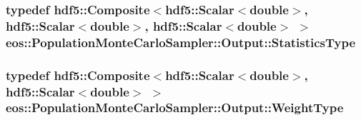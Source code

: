 \label{structeos_1_1PopulationMonteCarloSampler_1_1Output_ab096268a8fccb7e8d34ed08b93df880c}
\hypertarget{structeos_1_1PopulationMonteCarloSampler_1_1Output_abe071d58f8cee75754bcc593ec33e9b8}{
\subsubsection[{StatisticsType}]{\setlength{\rightskip}{0pt plus 5cm}typedef {\bf hdf5::Composite}$<${\bf hdf5::Scalar}$<$double$>$, {\bf hdf5::Scalar}$<$double$>$, {\bf hdf5::Scalar}$<$double$>$ $>$ {\bf eos::PopulationMonteCarloSampler::Output::StatisticsType}}}
\label{structeos_1_1PopulationMonteCarloSampler_1_1Output_abe071d58f8cee75754bcc593ec33e9b8}
\hypertarget{structeos_1_1PopulationMonteCarloSampler_1_1Output_a4413a52234bdb64d96f842ad524a7ee8}{
\subsubsection[{WeightType}]{\setlength{\rightskip}{0pt plus 5cm}typedef {\bf hdf5::Composite}$<${\bf hdf5::Scalar}$<$double$>$, {\bf hdf5::Scalar}$<$double$>$ $>$ {\bf eos::PopulationMonteCarloSampler::Output::WeightType}}}
\label{structeos_1_1PopulationMonteCarloSampler_1_1Output_a4413a52234bdb64d96f842ad524a7ee8}


